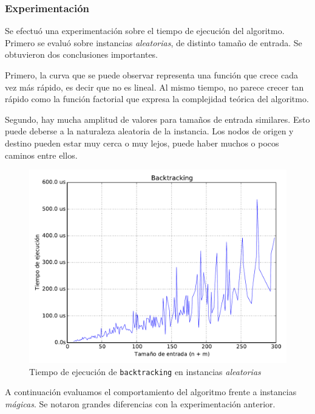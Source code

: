 \newpage
\subsubsection{Experimentación}

Se efectuó una experimentación sobre el tiempo de ejecución del algoritmo. Primero se evaluó sobre instancias \textit{aleatorias}, de distinto tamaño de entrada. Se obtuvieron dos conclusiones importantes.

Primero, la curva que se puede observar representa una función que crece cada vez más rápido, es decir que no es lineal. Al mismo tiempo, no parece crecer tan rápido como la función factorial que expresa la complejidad teórica del algoritmo.

Segundo, hay mucha amplitud de valores para tamaños de entrada similares. Esto puede deberse a la naturaleza aleatoria de la instancia. Los nodos de origen y destino pueden estar muy cerca o muy lejos, puede haber muchos o pocos caminos entre ellos.

\begin{figure}[H]
    \begin{center}
        \includegraphics[width=\textwidth]{imagenes/backtracking-complejidad-random.pdf}
        \caption{Tiempo de ejecución de \texttt{backtracking} en instancias \textit{aleatorias}}
    \end{center}
\end{figure}

\newpage
A continuación evaluamos el comportamiento del algoritmo frente a instancias \textit{mágicas}. Se notaron grandes diferencias con la experimentación anterior.

